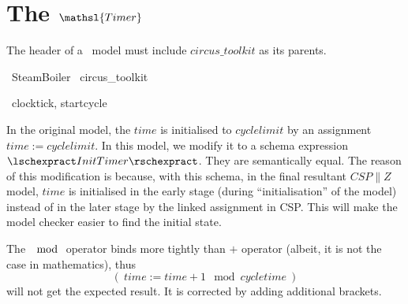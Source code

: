 \documentclass{report} %
\begin{document}
%

\chapter{The $\mathsl{Timer}$}

The header of a \Circus\ model must include $circus\_toolkit$ as its parents.
\begin{zsection}
	\SECTION\ SteamBoiler \parents\ circus\_toolkit
\end{zsection}

\begin{circus}
    \circchannel\ clocktick, startcycle
\end{circus}

In the original model, the $time$ is initialised to $cyclelimit$ by an assignment $time := cyclelimit$. In this model, we modify it to a schema expression $\lschexpract InitTimer \rschexpract$. They are semantically equal. The reason of this modification is because, with this schema, in the final resultant $CSP \parallel Z$ model, $time$ is initialised in the early stage (during ``initialisation'' of the model) instead of in the later stage by the linked assignment in CSP. This will make the model checker easier to find the initial state. 

The $\mod$ operator binds more tightly than $+$ operator (albeit, it is not the case in mathematics), thus 
\[(~time := time + 1 \mod cycletime ~)\]
will not get the expected result. It is corrected by adding additional brackets.
\end{document}
